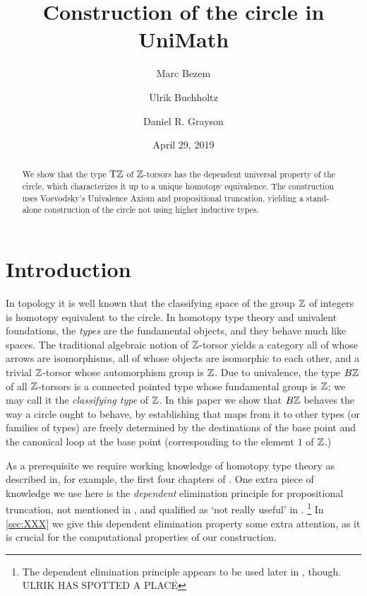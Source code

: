 \documentclass[a4,12pt]{amsart}
\newcounter{chapter}%
\begin{document}
\title{Construction of the circle in UniMath}
{
    \author{Marc Bezem}
    \address{}
    \email{}
    \urladdr{}
}
{
    \author{Ulrik Buchholtz}
    \address{}
    \email{}
    \urladdr{}
}
{
    \author{Daniel R. Grayson}
}
\date{April 29, 2019}
\maketitle
{}%

\begin{abstract}
We show that the type ${\mathrm{T}\mathbb{Z}}$ of $\mathbb{Z}$-torsors has the dependent universal property of the circle, 
which characterizes it up to a unique homotopy equivalence.  
The construction uses Voevodsky's Univalence Axiom and propositional truncation, 
yielding a stand-alone construction of the
circle not using higher inductive types.
\end{abstract}

\section{Introduction}

In topology it is well known that the classifying space of the group $\mathbb{Z}$ of integers is homotopy equivalent to the circle.  In homotopy type
theory and univalent foundations, the {\em types} are the fundamental objects, and they behave much like spaces.  The traditional algebraic
notion of $\mathbb{Z}$-torsor yields a category all of whose arrows are isomorphisms, all of whose objects are isomorphic to each other, and a
trivial $\mathbb{Z}$-torsor whose automorphism group is $\mathbb{Z}$.  Due to univalence, the type $B\mathbb{Z}$ of all $\mathbb{Z}$-torsors is a connected pointed type
whose fundamental group is $\mathbb{Z}$; we may call it the {\em classifying type} of $\mathbb{Z}$.  In this paper we show that $B\mathbb{Z}$ behaves the way a
circle ought to behave, by establishing that maps from it to other types (or families of types) are freely determined by the destinations of the
base point and the canonical loop at the base point (corresponding to the element $1$ of $\mathbb{Z}$.)

As a prerequisite we require working knowledge of homotopy type theory
as described in, for example, the first four chapters of \cite{hottbook}.
One extra piece of knowledge we use here is the \emph{dependent} elimination
principle for propositional truncation, not mentioned in \cite[Ch. 3.7]{hottbook},
and qualified as `not really useful' in \cite[Ch. 6.9]{hottbook}.
\footnote{The dependent elimination principle appears to 
be used later in \cite{hottbook}, though. ULRIK HAS SPOTTED A PLACE}
In \cref{sec:XXX} we give this dependent elimination property some extra
attention, as it is crucial for the computational properties of our construction.
\end{document}

